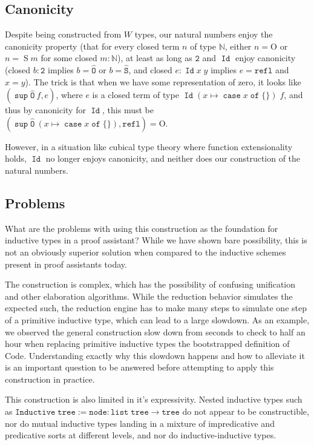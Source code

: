 \documentclass[a4paper,UKenglish,cleveref,nameinlink,autoref,thm-restate]{lipics-v2019}
\newcommand{\bool}{\mathtt{2}}
\newcommand{\codeO}{\mathtt{\hat{O}}}
\newcommand{\codeS}{\mathtt{\hat{S}}}
\DeclareMathOperator{\supop}{\mathtt{sup}}
\renewcommand{\sup}[2]{\supop {#1}\:\!{#2}}
\newcommand{\N}{\hyperref[define-N]{\mathbb{N}}}
\DeclareMathOperator{\case}{\mathtt{case}}
\newcommand{\caset}[2]{\case {#1}\;\mathtt{of}\;\{{#2}\}}
\DeclareMathOperator{\Idop}{\mathtt{Id}}
\newcommand{\Id}[2]{\Idop {#1}\;{#2}}
\newcommand{\refl}{\mathtt{refl}}
\newcommand{\zerO}{\hyperref[define-O]{\mathrm{O}}}
\DeclareMathOperator{\Succ}{\hyperref[define-S]{S}}
\newcommand{\Code}{\mathrm{Code}}
\begin{document}
\subsection{Canonicity}
Despite being constructed from $W$ types, our natural numbers enjoy the canonicity property (that for every closed term $n$ of type $\N$, either $n = \zerO$ or $n = \Succ m$ for some closed $m : \N$), at least as long as $\bool$ and $\Idop$ enjoy canonicity (closed $b : \bool$ implies $b = \codeO$ or $b = \codeS$, and closed $e : \Id{x}{y}$ implies $e = \refl$ and $x = y$). The trick is that when we have some representation of zero, it looks like $(\sup{\codeO}{f},e)$, where $e$ is a closed term of type $\Id{(x\mapsto\caset{x}{})}{f}$, and thus by canonicity for $\Idop$, this must be $(\sup{\codeO}{(x\mapsto\caset{x}{})},\refl) = \zerO$.

However, in a situation like cubical type theory where function extensionality holds, $\Idop$ no longer enjoys canonicity, and neither does our construction of the natural numbers.

\subsection{Problems}
What are the problems with using this construction as the foundation for inductive types in a proof assistant? While we have shown bare possibility, this is not an obviously superior solution when compared to the inductive schemes present in proof assistants today.

The construction is complex, which has the possibility of confusing unification and other elaboration algorithms. While the reduction behavior simulates the expected such, the reduction engine has to make many steps to simulate one step of a primitive inductive type, which can lead to a large slowdown. As an example, we observed the general construction slow down from seconds to check to half an hour when replacing primitive inductive types the bootstrapped definition of $\Code$. Understanding exactly why this slowdown happens and how to alleviate it is an important question to be answered before attempting to apply this construction in practice.

This construction is also limited in it's expressivity. Nested inductive types such as $\mathtt{Inductive}\;\mathtt{tree} := \mathtt{node} : \mathtt{list}\;\mathtt{tree} \to \mathtt{tree}$ do not appear to be constructible, nor do mutual inductive types landing in a mixture of impredicative and predicative sorts at different levels, and nor do inductive-inductive types.
\end{document}
